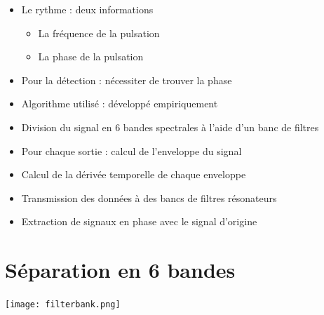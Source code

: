 \documentclass{beamer}
\begin{document}
 \begin{frame}
  \begin{itemize}
   \item Le rythme : deux informations
   \begin{itemize}
   \item<2-> La fréquence de la pulsation
   \item<3-> La phase de la pulsation
   \end{itemize}
   \item<4-> Pour la détection : nécessiter de trouver la phase
   \item<5-> Algorithme utilisé : développé empiriquement
  \end{itemize}

 \end{frame}

 \begin{frame}
  \begin{itemize}
   \item Division du signal en 6 bandes spectrales à l'aide d'un banc de filtres
   \item<2-> Pour chaque sortie : calcul de l'enveloppe du signal
   \item<3-> Calcul de la dérivée temporelle de chaque enveloppe
   \item<4-> Transmission des données à des bancs de filtres résonateurs
   \item<5-> Extraction de signaux en phase avec le signal d'origine
  \end{itemize}
 \end{frame}

 \section{Séparation en 6 bandes}
 
  \begin{frame}
       \tableofcontents[currentsection]
\end{frame}

 \begin{frame}
    \begin{center}
   \texttt{[image: filterbank.png]}
   \end{center}
 \end{frame}
\end{document}
